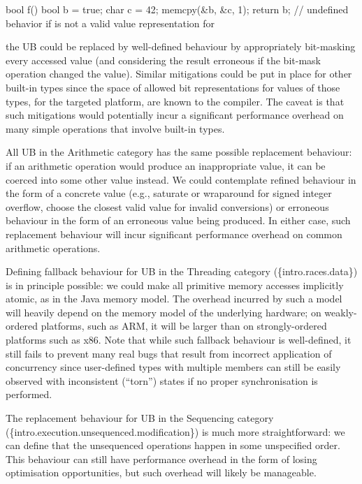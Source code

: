 \begin{codeblock}
bool f() {
  bool b = true;
  char c = 42;
  memcpy(&b, &c, 1);
  return b;         // undefined behavior if  is not a valid value representation for 
}
\end{codeblock}

the UB could be replaced by well-defined behaviour by appropriately bit-masking every accessed  value (and considering the result erroneous if the bit-mask operation changed the value). Similar mitigations could be put in place for other built-in types since the space of allowed bit representations for values of those types, for the targeted platform, are known to the compiler. The caveat is that such mitigations would potentially incur a significant performance overhead on many simple operations that involve built-in types.

All UB in the Arithmetic category has the same possible replacement behaviour: if an arithmetic operation would produce an inappropriate value, it can be coerced into some other value instead. We could contemplate refined behaviour in the form of a concrete value (e.g., saturate or wraparound for signed integer overflow, choose the closest valid value for invalid conversions) or erroneous behaviour in the form of an erroneous value being produced. In either case, such replacement behaviour will incur significant performance overhead on common arithmetic operations.

Defining fallback behaviour for UB in the Threading category (\{intro.races.data\}) is in principle possible: we could make all primitive memory accesses implicitly atomic, as in the Java memory model. The overhead incurred by such a model will heavily depend on the memory model of the underlying hardware; on weakly-ordered platforms, such as ARM,
it will be larger than on strongly-ordered platforms such as x86. Note that while such fallback behaviour is well-defined, it still fails to prevent many real bugs that result from incorrect application of concurrency since user-defined types with multiple members can still be easily observed with inconsistent (``torn'') states if no proper synchronisation is performed.

The replacement behaviour for UB in the Sequencing category (\{intro.execution.unsequenced.modifica\-tion\}) is much more straightforward: we can define that the unsequenced operations happen in some unspecified order. This behaviour can still have performance overhead in the form of losing  optimisation opportunities, but such overhead will likely be manageable. 

